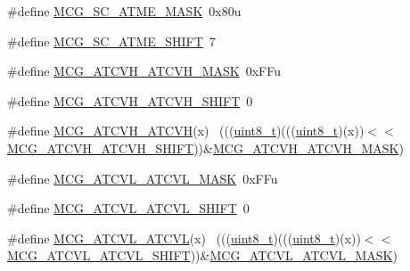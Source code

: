 \begin{DoxyCompactItemize}
\item 
\#define \hyperlink{group___m_c_g___register___masks_gaf9545e815c86bd04d8513af024cb8617}{M\+C\+G\+\_\+\+S\+C\+\_\+\+A\+T\+M\+E\+\_\+\+M\+A\+SK}~0x80u
\item 
\#define \hyperlink{group___m_c_g___register___masks_ga146594251d4266d02fecc44c1f0dd6ae}{M\+C\+G\+\_\+\+S\+C\+\_\+\+A\+T\+M\+E\+\_\+\+S\+H\+I\+FT}~7
\item 
\#define \hyperlink{group___m_c_g___register___masks_gaf989f84acb1a8c91c7c98c2255651b00}{M\+C\+G\+\_\+\+A\+T\+C\+V\+H\+\_\+\+A\+T\+C\+V\+H\+\_\+\+M\+A\+SK}~0x\+F\+Fu
\item 
\#define \hyperlink{group___m_c_g___register___masks_ga0fec2d450a98ab78dc7a2e4e9e33dbc6}{M\+C\+G\+\_\+\+A\+T\+C\+V\+H\+\_\+\+A\+T\+C\+V\+H\+\_\+\+S\+H\+I\+FT}~0
\item 
\#define \hyperlink{group___m_c_g___register___masks_gabc2689bb75b7c4cc672293dd43cdcc9d}{M\+C\+G\+\_\+\+A\+T\+C\+V\+H\+\_\+\+A\+T\+C\+VH}(x)                                          ~(((\hyperlink{_p_e___types_8h_aba7bc1797add20fe3efdf37ced1182c5}{uint8\+\_\+t})(((\hyperlink{_p_e___types_8h_aba7bc1797add20fe3efdf37ced1182c5}{uint8\+\_\+t})(x))$<$$<$\hyperlink{group___m_c_g___register___masks_ga0fec2d450a98ab78dc7a2e4e9e33dbc6}{M\+C\+G\+\_\+\+A\+T\+C\+V\+H\+\_\+\+A\+T\+C\+V\+H\+\_\+\+S\+H\+I\+FT}))\&\hyperlink{group___m_c_g___register___masks_gaf989f84acb1a8c91c7c98c2255651b00}{M\+C\+G\+\_\+\+A\+T\+C\+V\+H\+\_\+\+A\+T\+C\+V\+H\+\_\+\+M\+A\+SK})
\item 
\#define \hyperlink{group___m_c_g___register___masks_ga48750526150212b524f731e303a7e3cf}{M\+C\+G\+\_\+\+A\+T\+C\+V\+L\+\_\+\+A\+T\+C\+V\+L\+\_\+\+M\+A\+SK}~0x\+F\+Fu
\item 
\#define \hyperlink{group___m_c_g___register___masks_ga9e3e0eab24aaf1bf2905ae0cf4803eb3}{M\+C\+G\+\_\+\+A\+T\+C\+V\+L\+\_\+\+A\+T\+C\+V\+L\+\_\+\+S\+H\+I\+FT}~0
\item 
\#define \hyperlink{group___m_c_g___register___masks_gac69adca2b6c2222d1f35d7194b82ee41}{M\+C\+G\+\_\+\+A\+T\+C\+V\+L\+\_\+\+A\+T\+C\+VL}(x)                                          ~(((\hyperlink{_p_e___types_8h_aba7bc1797add20fe3efdf37ced1182c5}{uint8\+\_\+t})(((\hyperlink{_p_e___types_8h_aba7bc1797add20fe3efdf37ced1182c5}{uint8\+\_\+t})(x))$<$$<$\hyperlink{group___m_c_g___register___masks_ga9e3e0eab24aaf1bf2905ae0cf4803eb3}{M\+C\+G\+\_\+\+A\+T\+C\+V\+L\+\_\+\+A\+T\+C\+V\+L\+\_\+\+S\+H\+I\+FT}))\&\hyperlink{group___m_c_g___register___masks_ga48750526150212b524f731e303a7e3cf}{M\+C\+G\+\_\+\+A\+T\+C\+V\+L\+\_\+\+A\+T\+C\+V\+L\+\_\+\+M\+A\+SK})

\end{DoxyCompactItemize}
